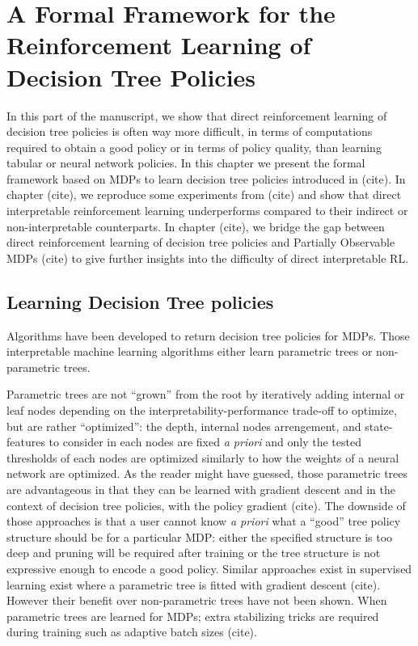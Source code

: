 \chapter{A Formal Framework for the Reinforcement Learning of Decision Tree Policies}
In this part of the manuscript, we show that direct reinforcement learning of decision tree policies is often way more difficult, in terms of computations required to obtain a good policy or in terms of policy quality, than learning tabular or neural network policies.
In this chapter we present the formal framework based on MDPs to learn decision tree policies introduced in (cite).
In chapter (cite), we reproduce some experiments from (cite) and show that  direct interpretable reinforcement learning underperforms compared to their indirect or non-interpretable counterparts.
In chapter (cite), we bridge the gap between direct reinforcement learning of decision tree policies and Partially Observable MDPs (cite) to give further insights into the difficulty of direct interpretable RL.

\section{Learning Decision Tree policies}
Algorithms have been developed to return decision tree policies for MDPs.
Those interpretable machine learning algorithms either learn parametric trees or non-parametric trees.

Parametric trees are not ``grown'' from the root by iteratively adding internal or leaf nodes depending on the interpretability-performance trade-off to optimize, but are rather ``optimized'': the depth, internal nodes arrengement, and state-features to consider in each nodes are fixed \textit{a priori} and only the tested thresholds of each nodes are optimized similarly to how the weights of a neural network are optimized.
As the reader might have guessed, those parametric trees are advantageous in that they can be learned with gradient descent and in the context of decision tree policies, with the policy gradient (cite).
The downside of those approaches is that a user cannot know \textit{a priori}  what a ``good'' tree policy structure should be for a particular MDP: either the specified structure is too deep and pruning will be required after training or the tree structure is not expressive enough to encode a good policy. 
Similar approaches exist in supervised learning exist where a parametric tree is fitted with gradient descent (cite). However their benefit over non-parametric trees have not been shown.
When parametric trees are learned for MDPs; extra stabilizing tricks are required during training such as adaptive batch sizes (cite).

